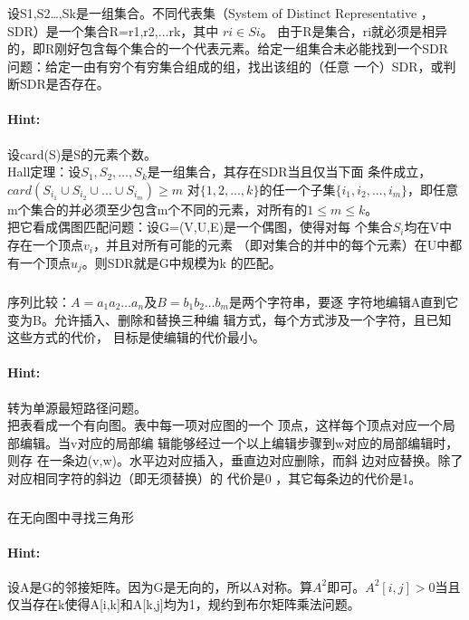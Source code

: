 \documentclass{article}
\begin{document}
     
     \subsubsection{}设S1,S2…,Sk是一组集合。不同代表集（System of Distinct
Representative ，SDR）是一个集合R={r1,r2,...rk}，其中 $ri \in Si$。
由于R是集合，ri就必须是相异的，即R刚好包含每个集合的一个代表元素。给定一组集合未必能找到一个SDR\\
问题：给定一由有穷个有穷集合组成的组，找出该组的（任意
一个）SDR，或判断SDR是否存在。
     \paragraph{Hint:}设card(S)是S的元素个数。\\
     Hall定理：设$S_1,S_2,…,S_k$是一组集合，其存在SDR当且仅当下面
条件成立，$card(S_{i_1} \cup S_{i_2} \cup... \cup S_{i_m} ) \geq m $ 对$\{1,2,...,k\}$的任一个子集$\{i_1,i_2,...,i_m\}$，即任意m个集合的并必须至少包含m个不同的元素，对所有的$1\leq m \leq k$。\\
把它看成偶图匹配问题：设G=(V,U,E)是一个偶图，使得对每
个集合$S_i$均在V中存在一个顶点$v_i$，并且对所有可能的元素
（即对集合的并中的每个元素）在U中都有一个顶点$u_j$。则SDR就是G中规模为k
的匹配。
     
     \subsubsection{}序列比较：$A=a_1 a_2 …a_n$及$B=b_ 1 b_2 …b
     _ m$是两个字符串，要逐
字符地编辑A直到它变为B。允许插入、删除和替换三种编
辑方式，每个方式涉及一个字符，且已知这些方式的代价，
目标是使编辑的代价最小。

     \paragraph{Hint:}转为单源最短路径问题。\\
     把表看成一个有向图。表中每一项对应图的一个
顶点，这样每个顶点对应一个局部编辑。当v对应的局部编
辑能够经过一个以上编辑步骤到w对应的局部编辑时，则存
在一条边(v,w)。水平边对应插入，垂直边对应删除，而斜
边对应替换。除了对应相同字符的斜边（即无须替换）的
代价是0 ，其它每条边的代价是1。
     
     \subsubsection{}在无向图中寻找三角形
     \paragraph{Hint:}设A是G的邻接矩阵。因为G是无向的，所以A对称。算$A^2$即可。$A^2
[i,j]>0$当且仅当存在k使得A[i,k]和A[k,j]均为1，规约到布尔矩阵乘法问题。
     
\end{document}
